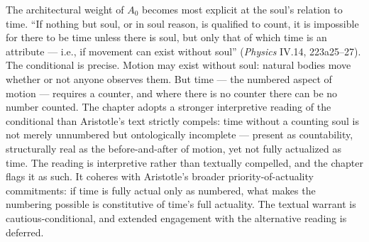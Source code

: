 The architectural weight of $A_0$ becomes most explicit at the soul's relation to time. ``If nothing but soul, or in soul reason, is qualified to count, it is impossible for there to be time unless there is soul, but only that of which time is an attribute --- i.e., if movement can exist without soul'' (\textit{Physics} IV.14, 223a25--27). The conditional is precise. Motion may exist without soul: natural bodies move whether or not anyone observes them. But time --- the numbered aspect of motion --- requires a counter, and where there is no counter there can be no number counted. The chapter adopts a stronger interpretive reading of the conditional than Aristotle's text strictly compels: time without a counting soul is not merely unnumbered but ontologically incomplete --- present as countability, structurally real as the before-and-after of motion, yet not fully actualized as time. The reading is interpretive rather than textually compelled, and the chapter flags it as such. It coheres with Aristotle's broader priority-of-actuality commitments: if time is fully actual only as numbered, what makes the numbering possible is constitutive of time's full actuality. The textual warrant is cautious-conditional, and extended engagement with the alternative reading is deferred.

